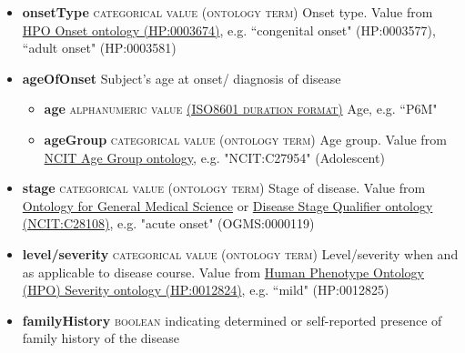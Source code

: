 \documentclass[a4paper, 10pt]{article}        %
\begin{document}
\begin{description}
\begin{itemize}
			\item[] \textbf{onsetType} {\textsc{categorical value (ontology term)}}
 Onset type. Value from \href{http://purl.obolibrary.org/obo/HP_0003674}{HPO Onset ontology (HP:0003674)}, e.g. ``congenital onset" (HP:0003577), ``adult onset" (HP:0003581)
			\item[]  \textbf{ageOfOnset} Subject's age at onset/ diagnosis of disease
			\begin{itemize}
			\item[] \textbf{age} {\textsc{alphanumeric value \href{https://www.iso.org/iso-8601-date-and-time-format.html}{(ISO8601 duration format)}}} Age, e.g. ``P6M"  
			\item[] \textbf{ageGroup} {\textsc{categorical value (ontology term)}} Age group. Value from \href{https://www.ebi.ac.uk/ols/ontologies/ncit/terms?iri=http%3A%2F%2Fpurl.obolibrary.org%2Fobo%2FNCIT_C20587}{NCIT Age Group ontology}, e.g. "NCIT:C27954" (Adolescent)
			\end{itemize}
			\item[]  \textbf{stage} {\textsc{categorical value (ontology term)}} Stage of disease. Value from \href{https://www.ebi.ac.uk/ols/ontologies/ogms}{Ontology for General Medical Science} or \href{https://www.ebi.ac.uk/ols/ontologies/ncit/terms?iri=http%3A%2F%2Fpurl.obolibrary.org%2Fobo%2FNCIT_C28108}{Disease Stage Qualifier ontology (NCIT:C28108)}, e.g. "acute onset" (OGMS:0000119)
			\item[] \textbf{level/severity} {\textsc{categorical value (ontology term)}} Level/severity when and as applicable to disease course. Value from \href{http://purl.obolibrary.org/obo/HP_0012824}{Human Phenotype Ontology (HPO) Severity ontology (HP:0012824)}, e.g. ``mild" (HP:0012825)
			\item[] \textbf{familyHistory} {\textsc{boolean}} indicating determined or self-reported presence of family history of the disease
	\end{itemize}


\end{description}
\end{document}
